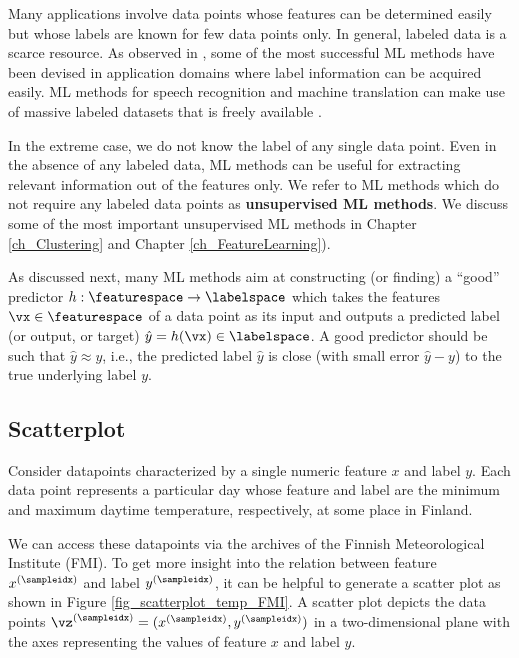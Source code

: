 \documentclass[12pt]{report}
\begin{document}
Many applications involve data points whose features can be determined easily but 
whose labels are known for few data points only. In general, labeled data is a scarce resource. 
As observed in \cite{UnreasonableData}, some of the most successful ML methods have been 
devised in application domains where label information can be acquired easily. ML methods for  
speech recognition and machine translation can make use of massive labeled datasets that is 
freely available \cite{Koehn2005}. 

In the extreme case, we do not know the label of any single data point. Even in the absence of 
any labeled data, ML methods can be useful for extracting relevant information out of the 
features only. We refer to ML methods which do not require any labeled data points 
as {\bf unsupervised ML methods}. We discuss some of the most important unsupervised ML 
methods in Chapter \ref{ch_Clustering} and Chapter \ref{ch_FeatureLearning}).  

As discussed next, many ML methods aim at constructing (or finding) a ``good'' 
predictor $h: \featurespace \rightarrow \labelspace$ which takes the features 
$\vx \in \featurespace$ of a data point as its input and outputs a predicted label 
(or output, or target) $\hat{y} = h(\vx) \in \labelspace$. A good predictor should 
be such that $\hat{y} \approx y$, i.e., the predicted label $\hat{y}$ is close (with 
small error $\hat{y} - y$) to the true underlying label $y$. 

\subsection{Scatterplot} 
\label{equ_subsection_scatterplot}

Consider datapoints characterized by a single numeric feature $x$ 
and label $y$. Each data point represents a particular day whose 
feature and label are the minimum and maximum daytime temperature, 
respectively, at some place in Finland. 

We can access these datapoints via the archives of the Finnish Meteorological Institute (FMI). 
To get more insight into the relation between feature $x^{(\sampleidx)}$ and label 
$y^{(\sampleidx)}$, it can be helpful to generate a scatter plot as shown in Figure \ref{fig_scatterplot_temp_FMI}. 
A scatter plot depicts the data points $\vz^{(\sampleidx)}=(x^{(\sampleidx)},y^{(\sampleidx)})$ 
in a two-dimensional plane with the axes representing the values of feature $x$ and label $y$. 
\end{document}
